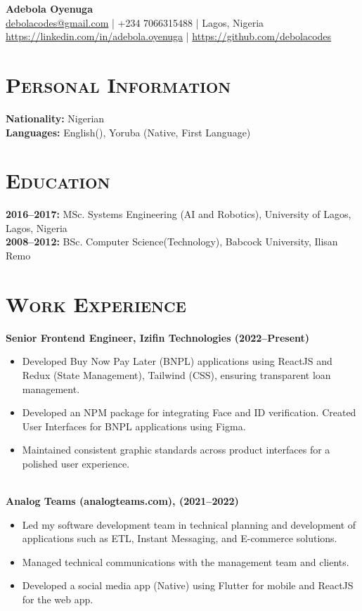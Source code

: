 \documentclass[a4paper,10pt]{article}
\newcommand{\cvsection}[1]{\section*{\scshape{#1}}}
\newcommand{\cvitem}[2]{\textbf{#1:} #2\\}
\begin{document}
\begin{center}
    {\LARGE \textbf{Adebola Oyenuga}}\\[0.5em]
    \href{mailto:debolacodes@gmail.com}{debolacodes@gmail.com} | +234 7066315488 | Lagos, Nigeria\\
    \href{https://linkedin.com/in/adebola.oyenuga}{https://linkedin.com/in/adebola.oyenuga} | \href{https://github.com/debolacodes}{https://github.com/debolacodes}
\end{center}

\cvsection{Personal Information}
\cvitem{Nationality}{Nigerian}
\cvitem{Languages}{English(), Yoruba (Native, First Language)}

\cvsection{Education}
\cvitem{2016--2017}{MSc. Systems Engineering (AI and Robotics), University of Lagos, Lagos, Nigeria}
\cvitem{2008--2012}{BSc. Computer Science(Technology), Babcock University, Ilisan Remo}


\cvsection{Work Experience}
\textbf{Senior Frontend Engineer, Izifin Technologies (2022--Present)}\\
\begin{itemize}[leftmargin=*]
    \item Developed Buy Now Pay Later (BNPL) applications using ReactJS and Redux
(State Management), Tailwind (CSS), ensuring transparent loan management.
    \item Developed an NPM package for integrating Face and ID verification.
Created User Interfaces for BNPL applications using Figma.
	\item Maintained consistent graphic standards across product interfaces for a
polished user experience.
\end{itemize}


\textbf{}\\
\textbf{Analog Teams (analogteams.com), (2021--2022)}\\
\begin{itemize}[leftmargin=*]
    \item Led my software development team in technical planning and development of applications such as ETL, Instant Messaging, and E-commerce solutions.
    \item Managed technical communications with the management team and clients.
    \item Developed a social media app (Native) using Flutter for mobile and ReactJS
for the web app.
\end{itemize}
\end{document}
